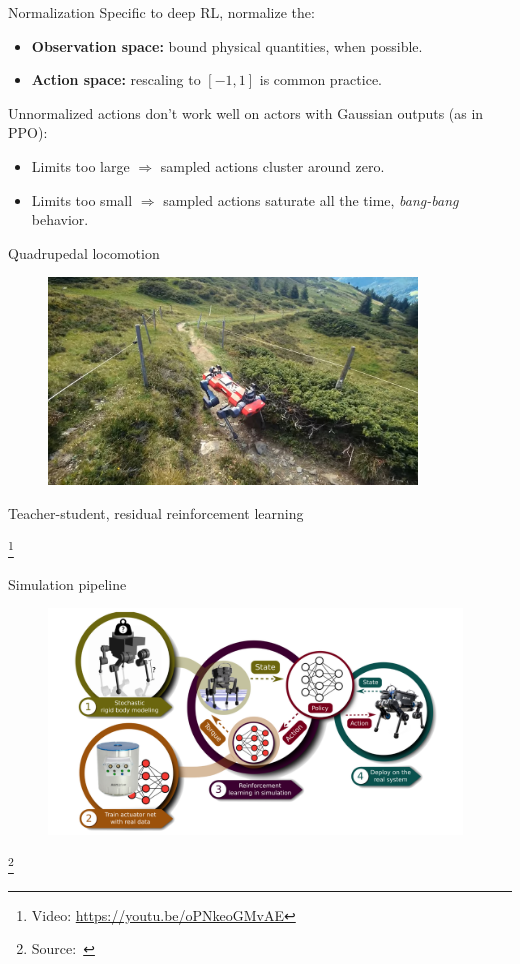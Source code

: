 \documentclass[10pt, aspectratio=1610]{beamer}
\newcommand\blfootnote[1]{%
  \begingroup
  \renewcommand\thefootnote{}%
  \footnote{#1}%
  \addtocounter{footnote}{-1}%
  \endgroup
}
\begin{document}
\begin{frame}{Normalization}
    Specific to deep RL, normalize the:
    \begin{itemize}
        \item \textbf{Observation space:} bound physical quantities, when possible.
        \item \textbf{Action space:} rescaling to $[-1, 1]$ is common practice.
    \end{itemize}
    Unnormalized actions don't work well on actors with Gaussian outputs (as in PPO):
    \begin{itemize}
        \item Limits too large $\Rightarrow$ sampled actions cluster around zero.
        \item Limits too small $\Rightarrow$ sampled actions saturate all the time, \emph{bang-bang} behavior.
    \end{itemize}
\end{frame}

\begin{frame}{Quadrupedal locomotion~\cite{lee2020}}
    \vspace{1.5em}
    \begin{figure}
        \includegraphics[height=5.5cm]{figures/hike-with-anymal.jpg}
    \end{figure}
    \begin{center}
        Teacher-student, residual reinforcement learning
    \end{center}
    \blfootnote{
        Video: \url{https://youtu.be/oPNkeoGMvAE}
    }
\end{frame}

\begin{frame}{Simulation pipeline}
    \begin{figure}
        \includegraphics[height=6cm]{figures/quadruped-sim-pipeline.png}
    \end{figure}
    \blfootnote{
        Source:~\cite{hwangbo2019}
    }
\end{frame}
\end{document}
